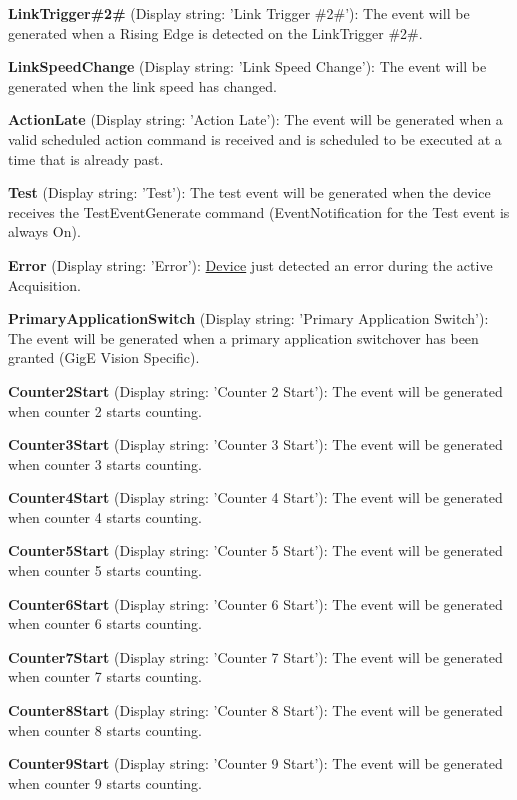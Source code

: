 \begin{DoxyItemize}
\item {\bfseries Link\+Trigger\#2\#} (Display string\+: 'Link Trigger \#2\#')\+: The event will be generated when a Rising Edge is detected on the Link\+Trigger \#2\#.
\item {\bfseries Link\+Speed\+Change} (Display string\+: 'Link Speed Change')\+: The event will be generated when the link speed has changed.
\item {\bfseries Action\+Late} (Display string\+: 'Action Late')\+: The event will be generated when a valid scheduled action command is received and is scheduled to be executed at a time that is already past.
\item {\bfseries Test} (Display string\+: 'Test')\+: The test event will be generated when the device receives the Test\+Event\+Generate command (Event\+Notification for the Test event is always On).
\item {\bfseries Error} (Display string\+: 'Error')\+: \hyperlink{classmv_i_m_p_a_c_t_1_1acquire_1_1_device}{Device} just detected an error during the active Acquisition.
\item {\bfseries Primary\+Application\+Switch} (Display string\+: 'Primary Application Switch')\+: The event will be generated when a primary application switchover has been granted (Gig\+E Vision Specific).
\item {\bfseries Counter2\+Start} (Display string\+: 'Counter 2 Start')\+: The event will be generated when counter 2 starts counting.
\item {\bfseries Counter3\+Start} (Display string\+: 'Counter 3 Start')\+: The event will be generated when counter 3 starts counting.
\item {\bfseries Counter4\+Start} (Display string\+: 'Counter 4 Start')\+: The event will be generated when counter 4 starts counting.
\item {\bfseries Counter5\+Start} (Display string\+: 'Counter 5 Start')\+: The event will be generated when counter 5 starts counting.
\item {\bfseries Counter6\+Start} (Display string\+: 'Counter 6 Start')\+: The event will be generated when counter 6 starts counting.
\item {\bfseries Counter7\+Start} (Display string\+: 'Counter 7 Start')\+: The event will be generated when counter 7 starts counting.
\item {\bfseries Counter8\+Start} (Display string\+: 'Counter 8 Start')\+: The event will be generated when counter 8 starts counting.
\item {\bfseries Counter9\+Start} (Display string\+: 'Counter 9 Start')\+: The event will be generated when counter 9 starts counting.

\end{DoxyItemize}
